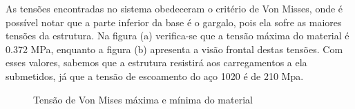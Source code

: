  As tensões encontradas no sistema obedeceram o critério de Von Misses, onde é possível notar que a parte inferior da base é o gargalo, pois ela sofre as maiores tensões da estrutura. Na figura (a) verifica-se que a tensão máxima do material é 0.372 MPa, enquanto a figura (b) apresenta a visão frontal destas tensões. Com esses valores, sabemos que a estrutura resistirá aos carregamentos a ela submetidos, já que a tensão de escoamento do aço 1020 é de 210 Mpa.

 \begin{figure}[!ht]
   \caption{Tensão de Von Mises máxima e mínima do material}
   \label{fig:analise_von_mises}
 \end{figure}

